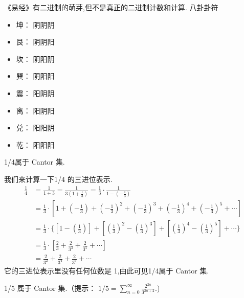 《易经》有二进制的萌芽,但不是真正的二进制计数和计算.
八卦卦符
\begin{itemize}
\item 坤： 阴阴阴
\item 艮： 阴阴阳
\item 坎： 阴阳阴
\item 巽： 阴阳阳
\item 震： 阳阴阴
\item 离： 阳阴阳
\item 兑： 阳阳阴
\item 乾： 阳阳阳
\end{itemize}



\begin{example}
	1/4属于 Cantor 集.
\end{example}
我们来计算一下1/4 的三进位表示.
\begin{align*}
\frac{1}{4} &= \frac{1}{1+3} = \frac{1}{3(1+ \frac{1}{3})} 
  = \frac{1}{3} \cdot \frac{1}{1 - (- \frac{1}{3})} \\
  &	= \frac{1}{3} \cdot \left[ 
1 + \left(- \frac{1}{3}\right)
+  \left(- \frac{1}{3}\right)^2 + \left(- \frac{1}{3}\right)^3 
+ \left(- \frac{1}{3}\right)^4   +\left(- \frac{1}{3}\right)^5  +\cdots\right] \\
  &	= \frac{1}{3} \cdot\Big\{ \left[ 
1 - \left( \frac{1}{3}\right)\right]
+ \left[  \left(\frac{1}{3}\right)^2 - \left(\frac{1}{3}\right)^3 \right]
+ \left[ \left(\frac{1}{3}\right)^4   -\left(\frac{1}{3}\right)^5 \right] +\cdots\Big\}\\
  &	= \frac{1}{3} \cdot \left[ 
 \frac{2}{3}+ \frac{2}{3^3}+ \frac{2}{3^5}+\cdots\right] \\
&=  \frac{2}{3^2}+ \frac{2}{3^4}+ \frac{2}{3^6}+\cdots
\end{align*}
\noindent
它的三进位表示里没有任何位数是 1,由此可见1/4属于 Cantor 集.

\begin{Exercises}
	
	\item 1/5 属于 Cantor 集.（提示：
	$1/5 = \sum_{n = 0}^\infty\frac{2^{2n}}{3^{2n+2}}$.)
	
	
\end{Exercises}


